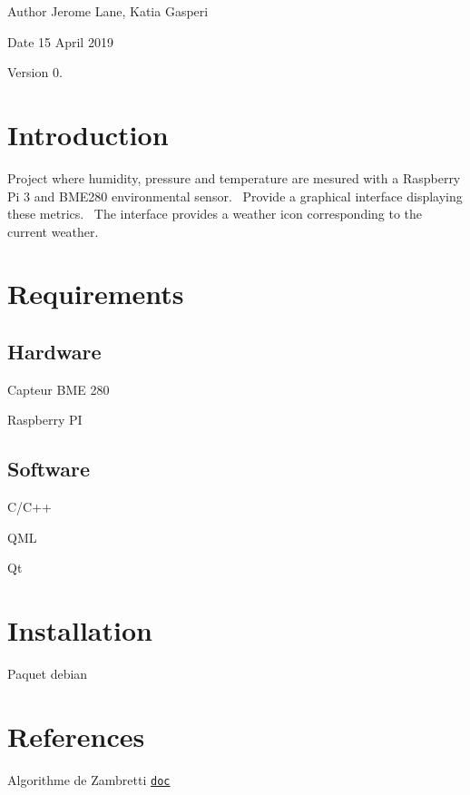 \begin{DoxyAuthor}{Author}
Jerome Lane, Katia Gasperi 
\end{DoxyAuthor}
\begin{DoxyDate}{Date}
15 April 2019 
\end{DoxyDate}
\begin{DoxyVersion}{Version}
0. 
\end{DoxyVersion}
\hypertarget{index_intro_sec}{}\section{Introduction}\label{index_intro_sec}
Project where humidity, pressure and temperature are mesured with a Raspberry Pi 3 and B\+M\+E280 environmental sensor.~\newline
 Provide a graphical interface displaying these metrics.~\newline
 The interface provides a weather icon corresponding to the current weather.\hypertarget{index_requirements_sec}{}\section{Requirements}\label{index_requirements_sec}
\hypertarget{index_Hardware}{}\subsection{Hardware}\label{index_Hardware}

\begin{DoxyItemize}
\item Capteur B\+ME 280 
\item Raspberry PI 
\end{DoxyItemize}\hypertarget{index_Software}{}\subsection{Software}\label{index_Software}

\begin{DoxyItemize}
\item C/\+C++ 
\item Q\+ML 
\item Qt 
\end{DoxyItemize}\hypertarget{index_install_sec}{}\section{Installation}\label{index_install_sec}
Paquet debian \hypertarget{index_References}{}\section{References}\label{index_References}

\begin{DoxyItemize}
\item Algorithme de Zambretti 
\footnotesize \href{https://web.archive.org/web/20110610213848/http://www.meteormetrics.com/zambretti.htm}{\tt doc}
\normalsize 
\end{DoxyItemize}

~\newline
~\newline
 